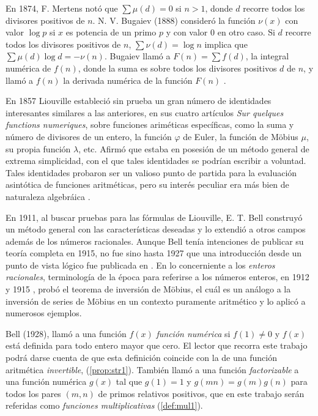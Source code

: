 En 1874, F. Mertens notó que $\sum \mu(d) = 0$ si $n>1$, donde $d$ recorre todos los divisores positivos de $n$.
N. V. Bugaiev (1888) consideró la función $\nu(x)$ con valor $\log p$ si $x$ es potencia de un primo $p$ y con valor 0 en otro caso. Si $d$ recorre todos los divisores positivos de $n$, $\sum \nu(d) = \log n$ implica que $\sum \mu(d) \log d = -\nu(n)$. Bugaiev llamó a $F(n) = \sum f(d)$, la integral numérica de $f(n)$, donde la suma es sobre todos los divisores positivos $d$ de $n$, y llamó a $f(n)$ la derivada numérica de la función $F(n)$ \cite{Di1}.
\newpage
\thispagestyle{easter3}

En 1857 Liouville estableció sin prueba un gran número de identidades interesantes similares a las anteriores, en sus cuatro artículos \emph{Sur quelques functions numeriques}, sobre funciones ariméticas específicas, como la suma y número de divisores de un entero, la función $\varphi$ de Euler, la función de Möbius $\mu$, su propia función $\lambda$, etc. Afirmó que estaba en posesión de un método general de extrema simplicidad, con el que tales identidades se podrían escribir a voluntad. Tales identidades probaron ser un valioso punto de partida para la evaluación asintótica de funciones aritméticas, pero su interés peculiar era más bien  de naturaleza algebráica \cite{Bell1}. 
\bigskip

En 1911, al buscar pruebas para las fórmulas de Liouville, E. T. Bell construyó un método general con las características deseadas y lo extendió a otros campos además de los números racionales. Aunque Bell tenía intenciones de publicar su teoría completa en 1915, no fue sino hasta 1927 que una introducción desde un punto de vista lógico fue publicada en \cite{Bell2}. En lo concerniente a los \textit{enteros racionales}, terminología de la época para referirse a los números enteros, en 1912 y 1915 \cite{Bell1}, probó el teorema de inversión de Möbius, el cuál es un análogo a la inversión de series de Möbius en un contexto puramente aritmético y lo aplicó a numerosos ejemplos.
\bigskip

Bell (1928), llamó a una función $f(x)$ \emph{función numérica} si $f(1) \ne 0$ y $f(x)$ está definida para todo entero mayor que cero. El lector que recorra este trabajo podrá darse cuenta de que esta definición coincide con la de una función aritmética \emph{invertible}, (\cref{prop:str1}). También llamó a una función \emph{factorizable} a una función numérica $g(x)$ tal que $g(1)=1$ y $g(m n)=g(m)g(n)$ para todos los pares $(m,n)$ de primos relativos positivos, que en este trabajo serán referidas como \emph{funciones multiplicativas} (\cref{def:mul1}).
\bigskip

